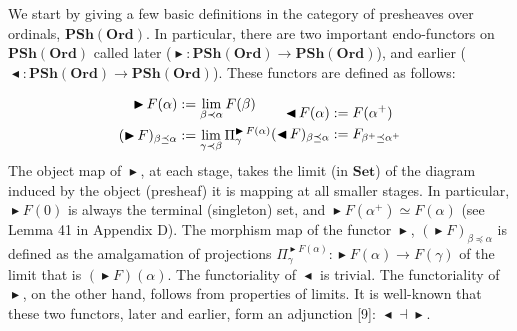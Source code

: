 We start by giving a few basic definitions in the category of presheaves over ordinals, $\mathbf{PSh}(\mathbf{Ord})$. In particular, there are two important endo-functors on $\mathbf{PSh}(\mathbf{Ord})$ called later ($\mathop{\blacktriangleright}:\mathbf{PSh}(\mathbf{Ord})\to\mathbf{PSh}(\mathbf{Ord})$), and earlier ($\mathop{\blacktriangleleft}:\mathbf{PSh}(\mathbf{Ord})\to\mathbf{PSh}(\mathbf{Ord})$). These functors are defined as follows:\par
    \[\begin{aligned} \mathop{\blacktriangleright}F(\alpha)&:=\lim_{\beta\prec\alpha}F(\beta)\\
(\mathop{\blacktriangleright}F)_{\beta\preceq\alpha}&:=\lim_{\gamma\prec\beta}\Pi^{\mathop{\blacktriangleright}F(\alpha)}_{\gamma}\\
\end{aligned}\hfill\begin{aligned} \mathop{\blacktriangleleft}F(\alpha)&:=F({\alpha}^{+})\\
(\mathop{\blacktriangleleft}F)_{\beta\preceq\alpha}&:=F_{{\beta}^{+}\preceq{\alpha}^{+}}\end{aligned}\hfill\]    
The object map of $\mathop{\blacktriangleright}$, at each stage, takes the limit (in $\mathbf{Set}$) of the diagram induced by the object (presheaf) it is mapping at all smaller stages. In particular, $\mathop{\blacktriangleright}F(0)$ is always the terminal (singleton) set, and $\mathop{\blacktriangleright}F({\alpha}^{+})\simeq F(\alpha)$ (see Lemma 41 in Appendix D). The morphism map of the functor $\mathop{\blacktriangleright}$, $(\mathop{\blacktriangleright}F)_{\beta\preceq\alpha}$ is defined as the amalgamation of projections $\Pi^{\mathop{\blacktriangleright}F(\alpha)}_{\gamma}:\mathop{\blacktriangleright}{}F(\alpha)\to F(\gamma)$ of the limit that is $(\mathop{\blacktriangleright}{}F)(\alpha)$. The functoriality of $\mathop{\blacktriangleleft}$ is trivial. The functoriality of $\mathop{\blacktriangleright}$, on the other hand, follows from properties of limits. It is well-known that these two functors, later and earlier, form an adjunction [9]: $\mathop{\blacktriangleleft}{}\dashv{}\mathop{\blacktriangleright}{}$.\par
 
 
 
